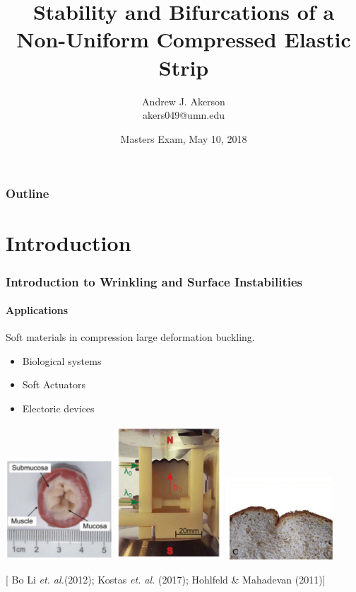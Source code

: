 \documentclass{beamer}
\begin{document}
\title{Stability and Bifurcations of a Non-Uniform Compressed Elastic Strip}%
\author[A. J. Akerson]{Andrew J. Akerson\\[10pt]
  \footnotesize akers049@umn.edu}%
\date{Masters Exam, May 10, 2018}%
%

\begin{frame}
  \titlepage
\end{frame}

\begin{frame}
  \frametitle{Outline}
  \tableofcontents[hideallsubsections]
\end{frame}

\section{Introduction}

\begin{frame}
	\frametitle{\large Introduction to Wrinkling and Surface Instabilities}
		\framesubtitle{Applications}
	Soft materials in compression \textrightarrow{} large deformation buckling.
	\begin{itemize}
	\item Biological systems
	\item Soft Actuators
	\item Electoric devices
	\end{itemize}
 	
 	\includegraphics[width=0.3\textwidth]{myFigures/biologicalThing}
	\includegraphics[width=0.3\textwidth]{myFigures/softActuator}
	\includegraphics[width=0.3\textwidth]{myFigures/bread}
	
		\scriptsize[\color{orange} Bo Li \textit{et. al.}(2012); Kostas \textit{et. al.} (2017); Hohlfeld \& Mahadevan (2011)\color{black}]

\end{frame}
\end{document}
